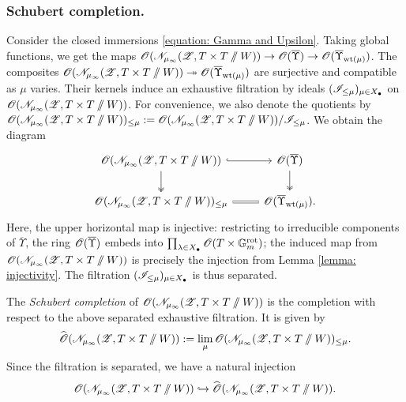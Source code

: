 \subsubsection{Schubert completion.}
Consider the closed immersions \eqref{equation: Gamma and Upsilon}. Taking global functions, we get the maps $\operatorname{\mathscr{O}}(\mathscr{N}_{\mu_{\infty}}(\operatorname{\mathscr{Z}}, T \times T \sslash W)) \to \operatorname{\mathscr{O}}(\overline{\Upsilon}) \to \operatorname{\mathscr{O}}(\overline{\Upsilon}_{\operatorname{wt}(\mu)})$. The composites $\operatorname{\mathscr{O}}(\mathscr{N}_{\mu_{\infty}}(\operatorname{\mathscr{Z}}, T \times T \sslash W)) \twoheadrightarrow \operatorname{\mathscr{O}}(\overline{\Upsilon}_{\operatorname{wt}(\mu)})$ are surjective and compatible as $\mu$ varies. Their kernels induce an exhaustive filtration by ideals $(\mathscr{I}_{\leq \mu})_{\mu \in X_{\bullet}}$ on $\operatorname{\mathscr{O}}(\mathscr{N}_{\mu_{\infty}}(\operatorname{\mathscr{Z}}, T \times T \sslash W))$. For convenience, we also denote the quotients by $\operatorname{\mathscr{O}}(\mathscr{N}_{\mu_{\infty}}(\operatorname{\mathscr{Z}}, T \times T \sslash W))_{\leq \mu} := \operatorname{\mathscr{O}}(\mathscr{N}_{\mu_{\infty}}(\operatorname{\mathscr{Z}}, T \times T \sslash W)) / \mathscr{I}_{\leq \mu} $. We obtain the diagram
\begin{equation}\label{equation: schubert completion square}
\begin{tikzcd}
\O(\eN_{\mu_{\infty}}(\eZ, T \times T \sslash W)) \arrow[r, hook] \arrow[d, two heads] & \O(\overline{\Upsilon})  \arrow[d, two heads] \\
\O(\eN_{\mu_{\infty}}(\eZ, T \times T \sslash W))_{\leq \mu} \arrow[r, equal] & \O(\overline{\Upsilon}_{\wt(\mu)}).
\end{tikzcd}
\end{equation}
Here, the upper horizontal map is injective: restricting to irreducible components of $\overline{\Upsilon}$, the ring $\operatorname{\mathscr{O}}(\overline{\Upsilon})$ embeds into $\prod_{\lambda \in X_{\bullet}} \operatorname{\mathscr{O}}(T \times \mathbb{G}_m^{\mathrm{rot}})$; the induced map from $\operatorname{\mathscr{O}}(\mathscr{N}_{\mu_{\infty}}(\operatorname{\mathscr{Z}}, T \times T \sslash W))$ is precisely the injection from Lemma \ref{lemma: injectivity}. The filtration $(\mathscr{I}_{\leq \mu})_{\mu \in X_{\bullet}}$ is thus separated.


\begin{definition}\label{definition: Schubert completion}
    The \textit{Schubert completion} of $\operatorname{\mathscr{O}}(\mathscr{N}_{\mu_{\infty}}(\operatorname{\mathscr{Z}}, T \times T \sslash W))$ is the completion with respect to the above separated exhaustive filtration. It is given by
    \begin{equation*}
        \widehat{\operatorname{\mathscr{O}}}(\mathscr{N}_{\mu_{\infty}}(\operatorname{\mathscr{Z}}, T \times T \sslash W)) := \operatorname*{lim}_{\mu} {\operatorname{\mathscr{O}}}(\mathscr{N}_{\mu_{\infty}}(\operatorname{\mathscr{Z}}, T \times T \sslash W))_{\leq \mu}.
    \end{equation*}
    Since the filtration is separated, we have a natural injection
    \begin{equation*}
     \operatorname{\mathscr{O}}(\mathscr{N}_{\mu_{\infty}}(\operatorname{\mathscr{Z}}, T \times T \sslash W)) \hookrightarrow  \widehat{\operatorname{\mathscr{O}}}(\mathscr{N}_{\mu_{\infty}}(\operatorname{\mathscr{Z}}, T \times T \sslash W)).
    \end{equation*}
\end{definition}


